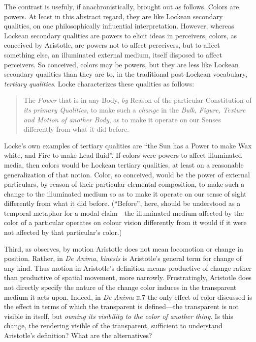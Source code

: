 The contrast is usefuly, if anachronistically, brought out as follows. Colors are powers. At least in this abstract regard, they are like Lockean secondary qualities, on one philosophically influential interpretation. However, whereas Lockean secondary qualities are powers to elicit ideas in perceivers, colors, as conceived by Aristotle, are powers not to affect perceivers, but to affect something else, an illuminated external medium, itself disposed to affect perceivers. So conceived, colors may be powers, but they are less like Lockean secondary qualities than they are to, in the traditional post-Lockean vocabulary, \emph{tertiary qualities}. Locke characterizes these qualities as follows: 
\begin{quote}
	The \emph{Power} that is in any Body, \emph{by} Reason of the particular Constitution of \emph{its primary Qualities}, to make such a \emph{change} in the \emph{Bulk, Figure, Texture and Motion of another Body}, as to make it operate on our Senses differently from what it did before. \citep[2.8.23]{Locke:1706hc} 
\end{quote}
Locke's \citeyearpar[2.8.23]{Locke:1706hc} own examples of tertiary qualities are ``the Sun has a Power to make Wax white, and Fire to make Lead fluid''. If colors were powers to affect illuminated media, then colors would be Lockean tertiary qualities, at least on a reasonable generalization of that notion. Color, so conceived, would be the power of external particulars, by reason of their particular elemental composition, to make such a change to the illuminated medium so as to make it operate on our sense of sight differently from what it did before. (``Before'', here, should be understood as a temporal metaphor for a modal claim---the illuminated medium affected by the color of a particular operates on colour vision differently from it would if it were not affected by that particular's color.)

Third, as \citet[367]{Hicks:1907uq} observes, by motion Aristotle does not mean locomotion or change in position. Rather, in \emph{De Anima}, \emph{kinesis} is Aristotle's general term for change of any kind. Thus motion in Aristotle's definition means productive of change rather than productive of spatial movement, more narrowly. Frustratingly, Aristotle does not directly specify the nature of the change color induces in the transparent medium it acts upon. Indeed, in \emph{De Anima} \textsc{ii}.7 the only effect of color discussed is the effect in terms of which the transparent is defined---the transparent is not visible in itself, but \emph{owning its visibility to the color of another thing}. Is this change, the rendering visible of the transparent, sufficient to understand Aristotle's definition? What are the alternatives?

